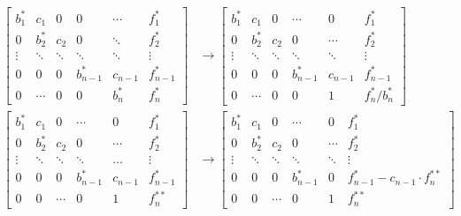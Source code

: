 \documentclass[a4paper,10pt,norsk]{article}
\begin{document}
\begin{align*}
\begin{bmatrix}
 b_1^*   &  c_1       &   0       & 0         &  \cdots  &  f_1^*  \\[-0.2em]
  0      &  b_2^*     &   c_2     & 0         &  \ddots  & f_2^*  \\
 \vdots  &   \ddots   &  \ddots  & \ddots    &  \ddots   & \vdots  \\  
 0         &    0     &  0       &  b_{n-1}^* & c_{n-1}    & f_{n-1}^* \\[0.7em]
 0         & \cdots   &  0       &  0        &   b_n^*   &  f_n^*
\end{bmatrix}&\rightarrow
\begin{bmatrix}
b_1^*  &  c_1       &   0       &  \cdots    & 0       &  f_1^*  \\
0      &  b_2^*     &   c_2     &    0       & \cdots  &  f_2^* \\ 
\vdots &  \ddots   & \ddots    &  \ddots    & \ddots  & \vdots  \\  
0      &   0       & 0         &  b_{n-1}^*  & c_{n-1}  & f_{n-1}^* \\[0.7em]
0      & \cdots    & 0         &  0         &   1     &  f_n^*/b_n^*
\end{bmatrix}\\
\begin{bmatrix}
 b_1^*   &  c_1       &   0       &  \cdots   & 0       &  f_1^* \\[0.5em]
  0      &  b_2^*     &   c_2     & 0         &  \cdots &  f_2^* \\ 
  \vdots &  \ddots    &  \ddots   & \ddots   & \dots    & \vdots \\[0.7em]  
 0       &  0         &    0      &  b_{n-1}^* & c_{n-1}  & f_{n-1}^* \\[0.7em]
 0       &  0         & \cdots    & 0         &   1     &  f_n^{**}
\end{bmatrix}&\rightarrow
\begin{bmatrix}
 b_1^*  &  c_1   &   0     &  \cdots   &   0     &  f_1^* \\[0.5em]
  0     &  b_2^* &   c_2   & 0         &  \cdots &  f_2^* \\ 
 \vdots & \ddots &  \ddots & \ddots    & \ddots & \vdots \\[0.7em]  
 0      &  0     &    0    &  b_{n-1}^* &   0     & f_{n-1}^*-c_{n-1} \cdot f_n^{**} \\[0.7em]
 0      &  0     & \cdots  & 0         &   1     &  f_n^{**}
\end{bmatrix}\\

\end{align*}
\end{document}

